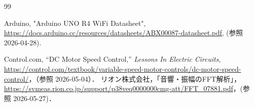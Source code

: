 \documentclass[lualatex,book,paper=a4paper,jafontsize=11.5pt,jafontscale=1.05]{jlreq}
\begin{document}
\begin{thebibliography}{99}

     Arduino, "Arduino UNO R4 WiFi Datasheet", \url{https://docs.arduino.cc/resources/datasheets/ABX00087-datasheet.pdf}, (参照 2026-04-28).

    Control.com, ``DC Motor Speed Control,'' {\em Lessons In Electric Circuits}, \\
    \url{https://control.com/textbook/variable-speed-motor-controls/dc-motor-speed-control/}，（参照 2026-05-04）．
    リオン株式会社，「音響・振幅のFFT解析」，\url{https://svmeas.rion.co.jp/support/p38veq0000000cmg-att/FFT_07881.pdf}，(参照 2026-05-27)．
\end{thebibliography}
\end{document}

